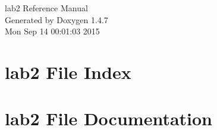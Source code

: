 \documentclass[a4paper]{book}
\begin{document}
\begin{titlepage}
\vspace*{7cm}
\begin{center}
{\Large lab2 Reference Manual}\\
\vspace*{1cm}
{\large Generated by Doxygen 1.4.7}\\
\vspace*{0.5cm}
{\small Mon Sep 14 00:01:03 2015}\\
\end{center}
\end{titlepage}
\clearemptydoublepage
{}
\tableofcontents
\clearemptydoublepage
{}
\chapter{lab2 File Index}

\chapter{lab2 File Documentation}



\printindex
\end{document}
